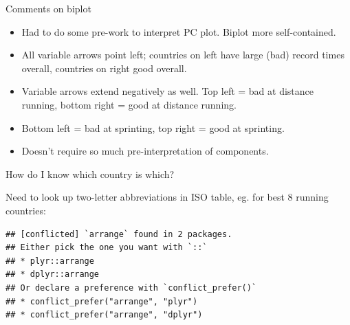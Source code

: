 \documentclass[ignorenonframetext,]{beamer}
\newenvironment{Shaded}{\begin{snugshade}}{\end{snugshade}}
\newcommand{\DataTypeTok}[1]{\textcolor[rgb]{0.13,0.29,0.53}{#1}}
\newcommand{\DecValTok}[1]{\textcolor[rgb]{0.00,0.00,0.81}{#1}}
\newcommand{\FloatTok}[1]{\textcolor[rgb]{0.00,0.00,0.81}{#1}}
\newcommand{\KeywordTok}[1]{\textcolor[rgb]{0.13,0.29,0.53}{\textbf{#1}}}
\newcommand{\NormalTok}[1]{#1}
\newcommand{\OperatorTok}[1]{\textcolor[rgb]{0.81,0.36,0.00}{\textbf{#1}}}
\newcommand{\StringTok}[1]{\textcolor[rgb]{0.31,0.60,0.02}{#1}}
\begin{document}
\begin{frame}{Comments on biplot}
\protect\hypertarget{comments-on-biplot}{}

\begin{itemize}
\item
  Had to do some pre-work to interpret PC plot. Biplot more
  self-contained.
\item
  All variable arrows point left; countries on left have large (bad)
  record times overall, countries on right good overall.
\item
  Variable arrows extend negatively as well. Top left = bad at distance
  running, bottom right = good at distance running.
\item
  Bottom left = bad at sprinting, top right = good at sprinting.
\item
  Doesn't require so much pre-interpretation of components.
\end{itemize}

\end{frame}

\begin{frame}[fragile]{How do I know which country is which?}
\protect\hypertarget{how-do-i-know-which-country-is-which}{}

Need to look up two-letter abbreviations in ISO table, eg. for best 8
running countries:

\begin{Shaded}
\end{Shaded}

\begin{verbatim}
## [conflicted] `arrange` found in 2 packages.
## Either pick the one you want with `::` 
## * plyr::arrange
## * dplyr::arrange
## Or declare a preference with `conflict_prefer()`
## * conflict_prefer("arrange", "plyr")
## * conflict_prefer("arrange", "dplyr")
\end{verbatim}

\end{frame}
\end{document}
